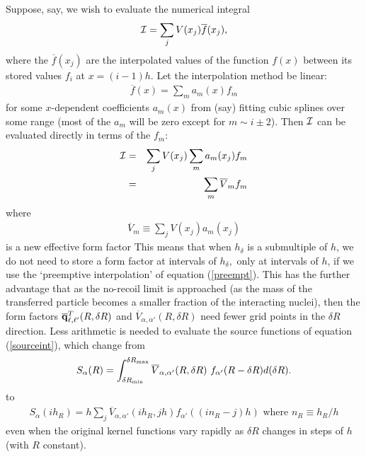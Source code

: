 \documentclass[11pt,a4paper]{article}
\begin{document}
Suppose, say, we wish to evaluate the numerical integral
\begin{eqnarray}
   {\cal I} = \sum _ j V(x_j) \overline f (x_j) ,
\end{eqnarray}
where the $\overline f (x_j)$ are the interpolated values of the
function $f(x)$ between its stored values $f_i$ at
$x = (i-1)h .$ Let the interpolation method be linear:
\begin{eqnarray}
  \overline f (x) = \sum _ m  a_m (x) f_m
\end{eqnarray}
for some $x$-dependent coefficients $a_m (x)$ from (say) fitting
cubic splines over some range (most of the $a_m$ will be zero except
for $ m\sim i\pm 2 $).  Then $\cal I$ can be evaluated directly
in terms of the $f_m : $
\begin{eqnarray}
 {\cal I} &=& \sum _ j V(x_j)
            \sum _ m  a_m (x_j)  f_m
\\
 &=& \sum _ m \overline V_m f_m
\end{eqnarray}
where
\begin{eqnarray} \label{preempt}
\overline V_m \equiv \sum _ j V(x_j) a_m (x_j)
\end{eqnarray}
is a new effective form factor
This means that when $h_\delta$ is a submultiple of $h$,
we do not need to store a form factor at intervals of $h_\delta ,$
only at intervals of $h$, if we use the `preemptive
interpolation' of equation (\ref{preempt}).
This has the further advantage that as the no-recoil limit is approached
(as the mass of the transferred particle becomes a smaller fraction of the
interacting nuclei), then the form factors
$ \overline{\bf q}^T_{\ell , \ell'} (R, \delta R) $ and
$\overline V_{\alpha ,\alpha'} (R, \delta R) $
need fewer grid points in the
$\delta R$ direction. Less arithmetic is needed to evaluate
the source functions of equation (\ref{sourceint}), which change from
\begin{eqnarray}
  S _\alpha (R) = \int_ {\delta R_{\rm min}} ^ {\delta R_{\rm max}}
           \overline V_{\alpha ,\alpha' } (R, \delta R) ~
           f_{\alpha'} (R - \delta R)  d( \delta R)           .
\end{eqnarray}
to
\begin{eqnarray}
 S _\alpha (i h_R) = h \sum _ j
          \overline V_{\alpha ,\alpha' } (ih_R , j h)
          f_{\alpha'} ((in_R - j)h)
          \mbox{  where } n_R \equiv h_R / h
\end{eqnarray}
even when the original kernel functions
vary rapidly as $\delta R$ changes in steps of $h$ (with $R$ constant).
\end{document}

